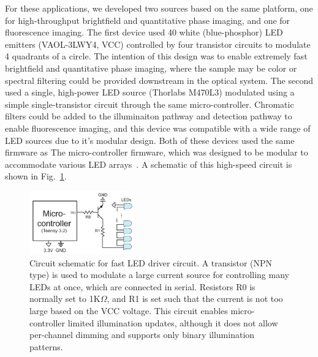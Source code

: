 For these applications, we developed two sources based on the same platform, one for high-throughput brightfield and quantitative phase imaging, and one for fluorescence imaging. The first device used 40 white (blue-phosphor) LED emitters (VAOL-3LWY4, VCC) controlled by four transistor circuits to modulate 4 quadrants of a circle. The intention of this design was to enable extremely fast brightfield and quantitative phase imaging, where the sample may be color or spectral filtering could be provided downstream in the optical system. The second used a single, high-power LED source (Thorlabs M470L3) modulated using a simple single-transistor circuit through the same micro-controller. Chromatic filters could be added to the illuminaiton pathway and detection pathway to enable fluorescence imaging, and this device was compatible with a wide range of LED sources due to it's modular design. Both of these devices used the same firmware as The micro-controller firmware, which was designed to be modular to accommodate various LED arrays~\cite{illuminate}. A schematic of this high-speed circuit is shown in Fig.~\ref{fig:fabrication_highthroughput_circuit}.

\begin{figure}
    \centering
    \includegraphics[width=0.4\textwidth]{figures/fig_fabrication_fast_circuit.pdf}
    \caption{Circuit schematic for fast LED driver circuit. A transistor (NPN type) is used to modulate a large current source for controlling many LEDs at once, which are connected in serial. Resistors R0 is normally set to 1K$\Omega$, and R1 is set such that the current is not too large based on the VCC voltage. This circuit enables micro-controller limited illumination updates, although it does not allow per-channel dimming and supports only binary illumination patterns.}\label{fig:fabrication_highthroughput_circuit}
\end{figure}

